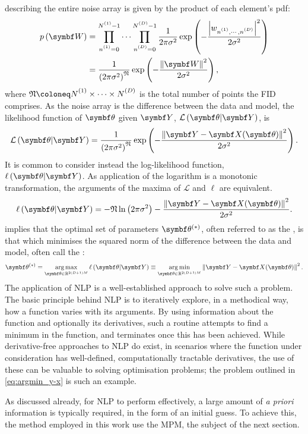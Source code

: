 describing the entire noise array is given by the product of each element's
\ac{pdf}:
\begin{equation}
    \begin{split}
        p\left(\bW\right) &=
            \prod_{\none=0}^{\None - 1}
            \cdots
            \prod_{\nD=0}^{\ND - 1}
            \frac{1}{2\pi \sigma^2}
            \exp\left(
                -\frac
                {\left\lvert \wnonenD \right\rvert^2}
                {2\sigma^2}\right) \\
            &= \frac{1}{\left(2\pi \sigma^2\right)^{\mathfrak{N}}}
            \exp\left( -\frac{\left\lVert \bW \right\rVert^2}{2\sigma^2}\right),
    \end{split}
\end{equation}
where $\mathfrak{N} \coloneq \None \times \cdots \times \ND$ is the total
number of points the \ac{FID} comprises.
As the noise array is the difference between the data and model, the
likelihood function of $\bth$ given $\bY$, $\mathcal{L}\left(\bth \vert
\bY\right)$, is
\begin{equation}
    \mathcal{L}\left(\bth \vert \bY\right) =
    \frac{1}{\left(2\pi \sigma^2\right)^{\mathfrak{N}}}
        \exp\left( -\frac{\left\lVert \bY - \bX(\bth) \right\rVert^2}{2\sigma^2}\right).
\end{equation}
It is common to consider instead the log-likelihood function,
$\ell\left(\bth \vert \bY\right)$. As application of the logarithm is a
monotonic transformation, the arguments of the maxima of $\mathcal{L}$ and
$\ell$ are equivalent.
\begin{equation}
    \ell\left(\bth \vert \bY\right) =
        -\mathfrak{N} \ln\left(2 \pi \sigma^2\right)
        -\frac{\left\lVert \bY - \bX(\bth) \right\rVert^2}{2\sigma^2}.
    \label{eq:log-likeihood}
\end{equation}
 implies that the optimal set of parameters
$\bth^{(*)}$, often referred to as the ,
is that which minimises the
squared norm of the difference between the data and model, often call the
:
\begin{equation}
    \bthstar = \argmax_{\bth \in \mathbb{R}^{2(D+1)M}}
        \ell\left(\bth \vert \bY\right) \equiv
        \argmin_{\bth \in \mathbb{R}^{2(D+1)M}} \left\lVert \bY - \bX(\bth) \right\rVert^2.
    \label{eq:argmin_y-x}
\end{equation}
The application of \ac{NLP} is a well-established approach to solve such a
problem\cite{Fletcher1987,Nocedal2006}. The basic principle behind \ac{NLP} is
to iteratively explore, in a methodical way, how a function varies with its
arguments. By using information about the function and optionally its
derivatives, such a routine attempts to find a minimum in the function, and
terminates once this has been achieved. While derivative-free approaches to
\ac{NLP} do exist\cite{Nelder1965,Kirkpatrick1983,Powell2009},
in scenarios where the function under consideration has well-defined,
computationally tractable derivatives, the use of these can be valuable to
solving optimisation problems; the problem outlined in
\cref{eq:argmin_y-x} is such an example.

As discussed already, for \ac{NLP} to perform effectively, a large amount of
\textit{a priori} information is typically required, in the form of an initial
guess.
To achieve this, the method employed in this work use the \ac{MPM}, the subject
of the next section.
